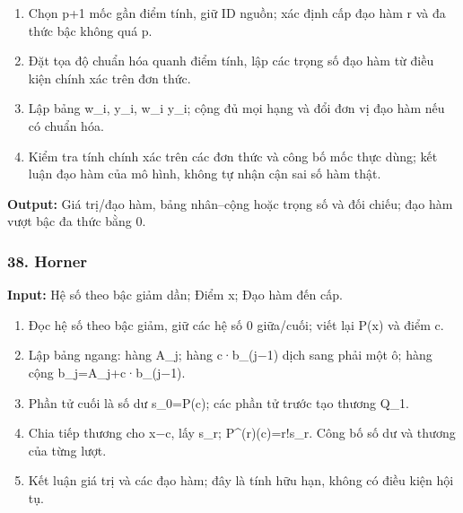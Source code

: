 \begin{enumerate}

\item Chọn p+\allowbreak{}1 mốc gần điểm tính,\allowbreak{} giữ ID nguồn;\allowbreak{} xác định cấp đạo hàm r và đa thức bậc không quá p.

\item Đặt tọa độ chuẩn hóa quanh điểm tính,\allowbreak{} lập các trọng số đạo hàm từ điều kiện chính xác trên đơn thức.

\item Lập bảng w\_i,\allowbreak{} y\_i,\allowbreak{} w\_i y\_i;\allowbreak{} cộng đủ mọi hạng và đổi đơn vị đạo hàm nếu có chuẩn hóa.

\item Kiểm tra tính chính xác trên các đơn thức và công bố mốc thực dùng;\allowbreak{} kết luận đạo hàm của mô hình,\allowbreak{} không tự nhận cận sai số hàm thật.

\end{enumerate}

\textbf{Output:} Giá trị/\allowbreak{}đạo hàm,\allowbreak{} bảng nhân–cộng hoặc trọng số và đối chiếu;\allowbreak{} đạo hàm vượt bậc đa thức bằng 0.

\examplebreak\subsubsection*{38. Horner}

\textbf{Input:} Hệ số theo bậc giảm dần;\allowbreak{} Điểm x;\allowbreak{} Đạo hàm đến cấp.

\begin{enumerate}

\item Đọc hệ số theo bậc giảm,\allowbreak{} giữ các hệ số 0 giữa/\allowbreak{}cuối;\allowbreak{} viết lại P(\allowbreak{}x) và điểm c.

\item Lập bảng ngang: hàng A\_j;\allowbreak{} hàng c·b\_(\allowbreak{}j\ensuremath{-}1) dịch sang phải một ô;\allowbreak{} hàng cộng b\_j=\allowbreak{}A\_j+\allowbreak{}c·b\_(\allowbreak{}j\ensuremath{-}1).

\item Phần tử cuối là số dư s\_0=\allowbreak{}P(\allowbreak{}c);\allowbreak{} các phần tử trước tạo thương Q\_1.

\item Chia tiếp thương cho x\ensuremath{-}c,\allowbreak{} lấy s\_r;\allowbreak{} P\textasciicircum{}(\allowbreak{}r)(\allowbreak{}c)=\allowbreak{}r!s\_r. Công bố số dư và thương của từng lượt.

\item Kết luận giá trị và các đạo hàm;\allowbreak{} đây là tính hữu hạn,\allowbreak{} không có điều kiện hội tụ.

\end{enumerate}

